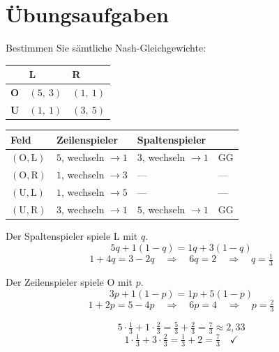 \section{Übungsaufgaben}

\begin{aufgabe}
Bestimmen Sie sämtliche Nash-Gleichgewichte:
\begin{center}
{\small
\renewcommand{\arraystretch}{1.6}
\begin{tabular}{@{}P{1.6cm}P{2.2cm}P{2.2cm}@{}}
\toprule
& \textbf{L} & \textbf{R}\\
\midrule
\textbf{O} & $(5,\ 3)$ & $(1,\ 1)$\\
\textbf{U} & $(1,\ 1)$ & $(3,\ 5)$\\
\bottomrule
\end{tabular}}
\end{center}

\loesung
{}
\begin{center}
{\small
\renewcommand{\arraystretch}{1.5}
\begin{tabular}{@{}P{1.6cm}P{2.6cm}P{2.6cm}P{1.2cm}@{}}
\toprule
\textbf{Feld} & \textbf{Zeilenspieler} & \textbf{Spaltenspieler} & \\
\midrule
$(\text{O},\text{L})$ & $5$, wechseln $\to1$ & $3$, wechseln $\to1$ & \textcolor{gruen}{GG}\\
$(\text{O},\text{R})$ & $1$, wechseln $\to3$ & --- & ---\\
$(\text{U},\text{L})$ & $1$, wechseln $\to5$ & --- & ---\\
$(\text{U},\text{R})$ & $3$, wechseln $\to1$ & $5$, wechseln $\to1$ & \textcolor{gruen}{GG}\\
\bottomrule
\end{tabular}}
\end{center}

 Der Spaltenspieler spiele L mit $q$.
\[ 5q + 1(1-q) = 1q + 3(1-q) \]
\[ 1 + 4q = 3 - 2q \quad\Longrightarrow\quad 6q = 2 \quad\Longrightarrow\quad q = \tfrac13 \]

 Der Zeilenspieler spiele O mit $p$.
\[ 3p + 1(1-p) = 1p + 5(1-p) \]
\[ 1 + 2p = 5 - 4p \quad\Longrightarrow\quad 6p = 4 \quad\Longrightarrow\quad p = \tfrac23 \]

\[ 5\cdot\tfrac13 + 1\cdot\tfrac23 = \tfrac53+\tfrac23 = \tfrac73 \approx 2{,}33 \]
\[ 1\cdot\tfrac13 + 3\cdot\tfrac23 = \tfrac13+2 = \tfrac73 \quad \checkmark \]


\end{aufgabe}
